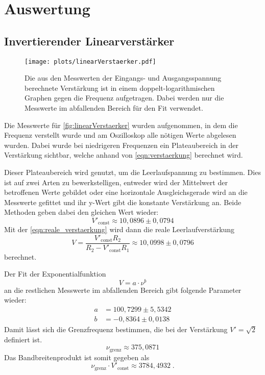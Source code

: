 \newpage
\section{Auswertung}
\label{sec:auswertung}
\subsection{Invertierender Linearverstärker}
    \begin{figure}[ht]
        \centering
        \texttt{[image: plots/linearVerstaerker.pdf]}
        \caption{Die aus den Messwerten der Eingangs- und Ausgangsspannung berechnete Verstärkung ist in einem doppelt-logarithmischen Graphen gegen die Frequenz aufgetragen. Dabei werden nur die Messwerte im abfallenden Bereich für den Fit verwendet.}
        \label{fig:linearVerstaerker}
    \end{figure}

    Die Messwerte für \autoref{fig:linearVerstaerker} wurden aufgenommen, in dem die Frequenz verstellt wurde und am Oszilloskop alle nötigen Werte abgelesen wurden. Dabei wurde bei niedrigeren Frequenzen ein Plateaubereich in der Verstärkung sichtbar, welche anhand von \autoref{eqn:verstaerkung} berechnet wird.

    Dieser Plateaubereich wird genutzt, um die Leerlaufspannung zu bestimmen. Dies ist auf zwei Arten zu bewerkstelligen, entweder wird der Mittelwert der betroffenen Werte gebildet oder eine horizontale Ausgleichsgerade wird an die Messwerte gefittet und ihr y-Wert gibt die konstante Verstärkung an. Beide Methoden geben dabei den gleichen Wert wieder:
    \begin{equation*}
        V'_{\mathrm{const}} \approx 10,0896 \pm 0,0794
    \end{equation*}
    Mit der \autoref{eqn:reale_verstaerkung} wird dann die reale Leerlaufverstärkung
    \begin{equation*}
        V = \frac{V'_{\mathrm{const}} R_2}{R_2 - V'_{\mathrm{const}} R_1} \approx 10,0998 \pm 0,0796
    \end{equation*}
    berechnet.


    Der Fit der Exponentialfunktion
    \begin{equation*}
        V = a \cdot \nu^{b}
    \end{equation*}
    an die restlichen Messwerte im abfallenden Bereich gibt folgende Parameter wieder:
    \begin{align*}
        a &= 100,7299 \pm 5,5342 \\
        b &= -0,8364 \pm 0,0138
    \end{align*}
    Damit lässt sich die Grenzfrequenz bestimmen, die bei der Verstärkung $V' = \sqrt{2}$ definiert ist.
    \begin{equation*}
        \nu_{\mathrm{grenz}} \approx 375,0871
    \end{equation*}
    Das Bandbreitenprodukt ist somit gegeben als
    \begin{equation*}
        \nu_{\mathrm{grenz}} \cdot V'_{\mathrm{const}} \approx 3784,4932 \;.
    \end{equation*}   

